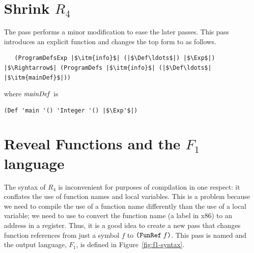 \documentclass[11pt]{book}
\begin{document}
\section{Shrink $R_4$}
\label{sec:shrink-r4}

The  pass performs a minor modification to ease the
later passes. This pass introduces an explicit  function
and changes the top  form to
 as follows.
\begin{lstlisting}
   (ProgramDefsExp |$\itm{info}$| (|$\Def\ldots$|) |$\Exp$|)
|$\Rightarrow$| (ProgramDefs |$\itm{info}$| (|$\Def\ldots$| |$\itm{mainDef}$|))
\end{lstlisting}
where $\mathit{mainDef}$ is
\begin{lstlisting}
(Def 'main '() 'Integer '() |$\Exp'$|)
\end{lstlisting}


\section{Reveal Functions and the $F_1$ language}
\label{sec:reveal-functions-r4}

The syntax of $R_4$ is inconvenient for purposes of compilation in one
respect: it conflates the use of function names and local
variables. This is a problem because we need to compile the use of a
function name differently than the use of a local variable; we need to
use  to convert the function name (a label in x86) to an
address in a register.  Thus, it is a good idea to create a new pass
that changes function references from just a symbol $f$ to
$\texttt{(FunRef}\;f\texttt{)}$. This pass is named  and the
output language, $F_1$, is defined in Figure~\ref{fig:f1-syntax}.
\end{document}
